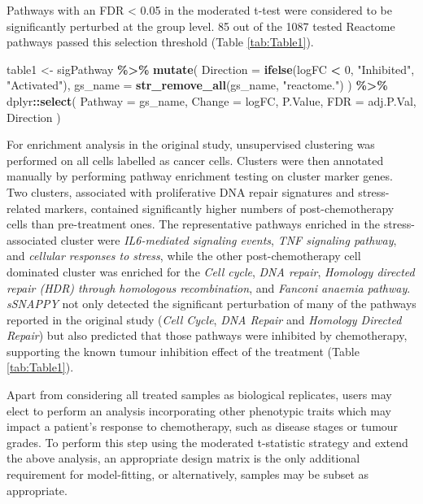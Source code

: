 \documentclass[9pt,a4paper,]{extarticle}
\newenvironment{Shaded}{\begin{snugshade}}{\end{snugshade}}
\newcommand{\AttributeTok}[1]{\textcolor[rgb]{0.13,0.29,0.53}{#1}}
\newcommand{\DecValTok}[1]{\textcolor[rgb]{0.00,0.00,0.81}{#1}}
\newcommand{\FunctionTok}[1]{\textcolor[rgb]{0.13,0.29,0.53}{\textbf{#1}}}
\newcommand{\NormalTok}[1]{#1}
\newcommand{\OtherTok}[1]{\textcolor[rgb]{0.56,0.35,0.01}{#1}}
\newcommand{\SpecialCharTok}[1]{\textcolor[rgb]{0.81,0.36,0.00}{\textbf{#1}}}
\newcommand{\StringTok}[1]{\textcolor[rgb]{0.31,0.60,0.02}{#1}}
\begin{document}
Pathways with an FDR \textless{} 0.05 in the moderated t-test were considered to be significantly perturbed at the group level.
85 out of the 1087 tested Reactome pathways passed this selection threshold (Table \ref{tab:Table1}).

\begin{Shaded}
\begin{Highlighting}[]
\NormalTok{table1 }\OtherTok{\textless{}{-}}\NormalTok{ sigPathway }\SpecialCharTok{\%\textgreater{}\%}
    \FunctionTok{mutate}\NormalTok{(}
        \AttributeTok{Direction =} \FunctionTok{ifelse}\NormalTok{(logFC }\SpecialCharTok{\textless{}} \DecValTok{0}\NormalTok{, }\StringTok{"Inhibited"}\NormalTok{, }\StringTok{"Activated"}\NormalTok{), }
        \AttributeTok{gs\_name =} \FunctionTok{str\_remove\_all}\NormalTok{(gs\_name, }\StringTok{"reactome."}\NormalTok{)}
\NormalTok{    ) }\SpecialCharTok{\%\textgreater{}\%}
\NormalTok{    dplyr}\SpecialCharTok{::}\FunctionTok{select}\NormalTok{(}
    \AttributeTok{Pathway =}\NormalTok{ gs\_name, }\AttributeTok{Change =}\NormalTok{ logFC,  P.Value, }\AttributeTok{FDR =}\NormalTok{ adj.P.Val, Direction}
\NormalTok{)}
\end{Highlighting}
\end{Shaded}

For enrichment analysis in the original study\citep{Zhang2022}, unsupervised clustering was performed on all cells labelled as cancer cells.
Clusters were then annotated manually by performing pathway enrichment testing on cluster marker genes.
Two clusters, associated with proliferative DNA repair signatures and stress-related markers, contained significantly higher numbers of post-chemotherapy cells than pre-treatment ones\citep{Zhang2022}.
The representative pathways enriched in the stress-associated cluster were \emph{IL6-mediated signaling events}, \emph{TNF signaling pathway}, and \emph{cellular responses to stress}, while the other post-chemotherapy cell dominated cluster was enriched for the \emph{Cell cycle}, \emph{DNA repair}, \emph{Homology directed repair (HDR) through homologous recombination}, and \emph{Fanconi anaemia pathway}.
\emph{sSNAPPY} not only detected the significant perturbation of many of the pathways reported in the original study (\emph{Cell Cycle}, \emph{DNA Repair} and \emph{Homology Directed Repair}) but also predicted that those pathways were inhibited by chemotherapy, supporting the known tumour inhibition effect of the treatment (Table \ref{tab:Table1}).

Apart from considering all treated samples as biological replicates, users may elect to perform an analysis incorporating other phenotypic traits which may impact a patient's response to chemotherapy, such as disease stages or tumour grades.
To perform this step using the moderated t-statistic strategy and extend the above analysis, an appropriate design matrix is the only additional requirement for model-fitting, or alternatively, samples may be subset as appropriate.
\end{document}
